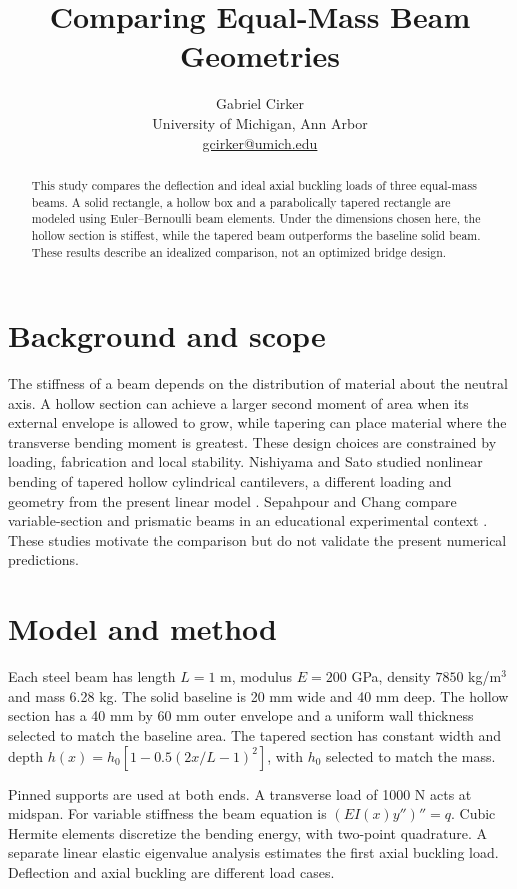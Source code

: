 \documentclass[11pt]{article}
\title{Comparing Equal-Mass Beam Geometries}
\author{Gabriel Cirker\\\small University of Michigan, Ann Arbor\\\small \href{mailto:gcirker@umich.edu}{gcirker@umich.edu}}
\date{}
\begin{document}
\maketitle
\begin{abstract}
This study compares the deflection and ideal axial buckling loads of three equal-mass beams. A solid rectangle, a hollow box and a parabolically tapered rectangle are modeled using Euler--Bernoulli beam elements. Under the dimensions chosen here, the hollow section is stiffest, while the tapered beam outperforms the baseline solid beam. These results describe an idealized comparison, not an optimized bridge design.
\end{abstract}
\section{Background and scope}
The stiffness of a beam depends on the distribution of material about the neutral axis. A hollow section can achieve a larger second moment of area when its external envelope is allowed to grow, while tapering can place material where the transverse bending moment is greatest. These design choices are constrained by loading, fabrication and local stability. Nishiyama and Sato studied nonlinear bending of tapered hollow cylindrical cantilevers, a different loading and geometry from the present linear model \cite{nishiyama}. Sepahpour and Chang compare variable-section and prismatic beams in an educational experimental context \cite{sepahpour}. These studies motivate the comparison but do not validate the present numerical predictions.

\section{Model and method}
Each steel beam has length $L=1$ m, modulus $E=200$ GPa, density $7850$ kg/m$^3$ and mass 6.28 kg. The solid baseline is 20 mm wide and 40 mm deep. The hollow section has a 40 mm by 60 mm outer envelope and a uniform wall thickness selected to match the baseline area. The tapered section has constant width and depth $h(x)=h_0[1-0.5(2x/L-1)^2]$, with $h_0$ selected to match the mass.

Pinned supports are used at both ends. A transverse load of 1000 N acts at midspan. For variable stiffness the beam equation is $(EI(x)y'')''=q$. Cubic Hermite elements discretize the bending energy, with two-point quadrature. A separate linear elastic eigenvalue analysis estimates the first axial buckling load. Deflection and axial buckling are different load cases.
\end{document}
